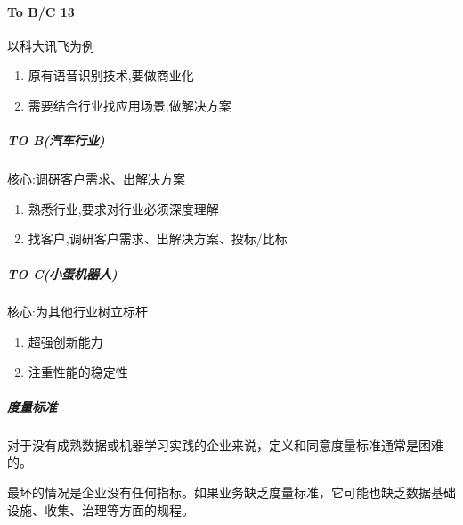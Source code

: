 \documentclass[letterpaper,10pt,english]{sphinxmanual}
\begin{document}
\paragraph{To B/C 13\sphinxfootnotemark[303]}
\label{\detokenize{chapter_introduction/AI_PM:to-b-c-13}}%
\begin{footnotetext}[303]\sphinxAtStartFootnote
{}
%
\end{footnotetext}\ignorespaces 
以科大讯飞为例
\begin{enumerate}
%
\item {} 
原有语音识别技术,要做商业化

\item {} 
需要结合行业找应用场景,做解决方案

\end{enumerate}


\subparagraph{TO B(汽车行业)}
\label{\detokenize{chapter_introduction/AI_PM:to-b}}
核心:调硏客户需求、出解决方案
\begin{enumerate}
%
\item {} 
熟悉行业,要求对行业必须深度理解

\item {} 
找客户,调研客户需求、出解决方案、投标/比标

\end{enumerate}


\subparagraph{TO C(小蛋机器人)}
\label{\detokenize{chapter_introduction/AI_PM:to-c}}
核心:为其他行业树立标杆
\begin{enumerate}
%
\item {} 
超强创新能力

\item {} 
注重性能的稳定性

\end{enumerate}


\subparagraph{度量标准}
\label{\detokenize{chapter_introduction/AI_PM:id35}}
对于没有成熟数据或机器学习实践的企业来说，定义和同意度量标准通常是困难的。

最坏的情况是企业没有任何指标。如果业务缺乏度量标准，它可能也缺乏数据基础设施、收集、治理等方面的规程。
\end{document}
